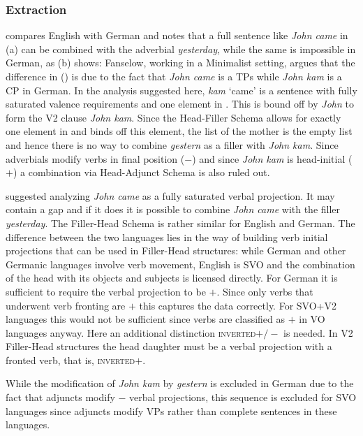 {{\subsubsection{Extraction}

\citet[]{Fanselow2009b} compares English with German and notes that a full sentence like \emph{John
  came} in (a) can be combined with the adverbial \emph{yesterday}, while the same is
impossible in German, as (b) shows:
\eal
{}
\zl
Fanselow, working in a Minimalist setting, argues that the difference in () is due to the
fact that \emph{John came} is a TPs while \emph{John kam} is a CP in German. In the analysis
suggested here, \emph{kam} `came' is a sentence with fully saturated valence requirements and one
element in \slasch. This is bound off by \emph{John} to form the V2 clause \emph{John kam}. Since
the Head-Filler Schema allows for exactly one element in \slasch and binds off this element, the
\slasch list of the mother is the empty list and hence there is no way to combine \emph{gestern} as
a filler with \emph{John kam}. Since adverbials modify verbs in final position (\initial$-$) and
since \emph{John kam} is head-initial (\initial$+$) a combination via Head-Adjunct Schema is also
ruled out.

\citet{ps2} suggested analyzing \emph{John came} as a fully saturated verbal projection. It may
contain a gap and if it does it is possible to combine \emph{John came} with the filler
\emph{yesterday}. The Filler-Head Schema is rather similar for English and German. The difference
between the two languages lies in the way of building verb initial projections that can be used in Filler-Head structures:
while German and other Germanic languages involve verb movement, English is SVO and the combination of the head with its objects
and subjects is licensed directly. For German it is sufficient to require the verbal projection to
be \initial$+$. Since only verbs that underwent verb fronting are \initial$+$ this captures the data
correctly. For SVO+V2 languages this would not be sufficient since verbs are classified as \initial$+$
in VO languages anyway. Here an additional distinction \textsc{inverted}$+/-$ is needed. In V2
Filler-Head structures the head daughter must be a verbal projection with a fronted verb, that is,
\textsc{inverted}$+$.

While the modification of \emph{John kam} by \emph{gestern} is excluded in German due to the fact
that adjuncts modify \initial$-$ verbal projections, this sequence is excluded for SVO languages
since adjuncts modify VPs rather than complete sentences in these languages. 

}}
